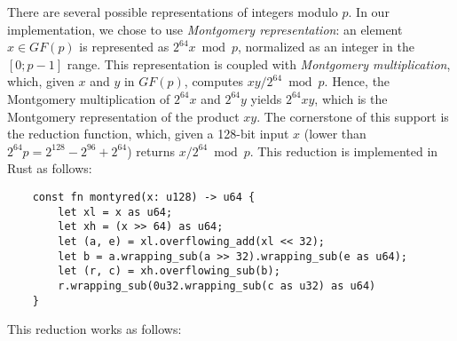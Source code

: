 \documentclass{llncs}
\newcommand{\GF}{GF}
\begin{document}
There are several possible representations of integers modulo $p$. In
our implementation, we chose to use \emph{Montgomery representation}: an
element $x \in \GF(p)$ is represented as $2^{64}x \bmod p$, normalized
as an integer in the $[0;p-1]$ range. This representation is coupled
with \emph{Montgomery multiplication}, which, given $x$ and $y$ in
$\GF(p)$, computes $xy/2^{64} \bmod p$. Hence, the Montgomery
multiplication of $2^{64}x$ and $2^{64}y$ yields $2^{64}xy$, which is
the Montgomery representation of the product $xy$. The cornerstone of
this support is the reduction function, which, given a 128-bit input $x$
(lower than $2^{64}p = 2^{128} - 2^{96} + 2^{64}$) returns $x/2^{64}
\bmod p$. This reduction is implemented in Rust as follows:
\begin{verbatim}
    const fn montyred(x: u128) -> u64 {
        let xl = x as u64;
        let xh = (x >> 64) as u64;
        let (a, e) = xl.overflowing_add(xl << 32);
        let b = a.wrapping_sub(a >> 32).wrapping_sub(e as u64);
        let (r, c) = xh.overflowing_sub(b);
        r.wrapping_sub(0u32.wrapping_sub(c as u32) as u64)
    }
\end{verbatim}
This reduction works as follows:
\end{document}

